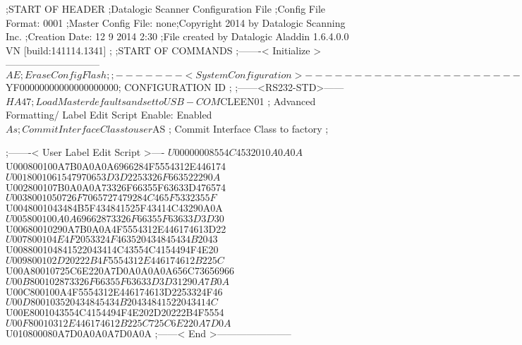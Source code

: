 ;START OF HEADER
;Datalogic Scanner Configuration File
;Config File Format: 0001
;Master Config File: none;Copyright 2014 by Datalogic Scanning Inc.
;Creation Date: 12 9 2014 2:30
;File created by Datalogic Aladdin 1.6.4.0.0 VN [build:141114.1341]
;
;START OF COMMANDS
;-------< Initialize >-----------------------------
$AE                 ; Erase Config Flash
;
;-------< System Configuration >-------------------------------
$YF00000000000000000000; CONFIGURATION ID
;
;------<RS232-STD>------
$HA47               ; Load Master defaults and set to USB-COM
$CLEEN01            ; Advanced Formatting/ Label Edit Script Enable: Enabled
$As                 ; Commit Interface Class to user
$AS                 ; Commit Interface Class to factory
;

;-------< User Label Edit Script >----
$U00000008554C4532010A0A0A
$U000800100A7B0A0A0A6966284F5554312E446174
$U0018001061547970653D3D2253326F663522290A
$U002800107B0A0A0A73326F66355F63633D476574
$U0038001050726F7065727479284C465F5332355F
$U0048001043484B5F434841525F43414C43290A0A
$U005800100A0A69662873326F66355F63633D3D30
$U00680010290A7B0A0A4F5554312E446174613D22
$U007800104E4F2053324F463520434845434B2043
$U008800104841522043414C43554C4154494F4E20
$U009800102D20222B4F5554312E446174612B225C
$U00A80010725C6E220A7D0A0A0A0A656C73656966
$U00B800102873326F66355F63633D3D31290A7B0A
$U00C800100A4F5554312E446174613D2253324F46
$U00D800103520434845434B20434841522043414C
$U00E8001043554C4154494F4E202D20222B4F5554
$U00F80010312E446174612B225C725C6E220A7D0A
$U010800080A7D0A0A0A7D0A0A
;------< End >-----------------------
